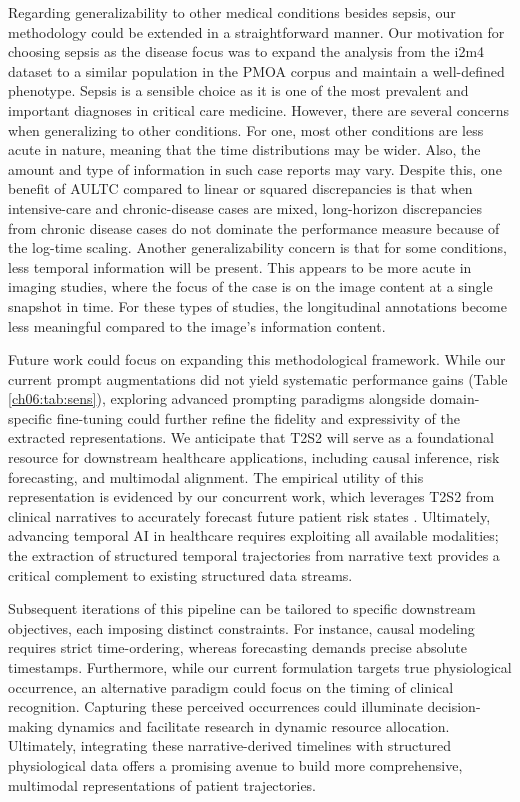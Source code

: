 Regarding generalizability to other medical conditions besides sepsis, our methodology could be extended in a straightforward manner.
Our motivation for choosing sepsis as the disease focus was to expand the analysis from the i2m4 dataset to a similar population in the PMOA corpus and maintain a well-defined phenotype.
Sepsis is a sensible choice as it is one of the most prevalent and important diagnoses in critical care medicine.  
However, there are several concerns when generalizing to other conditions.
For one, most other conditions are less acute in nature, meaning that the time distributions may be wider.
Also, the amount and type of information in such case reports may vary. 
Despite this, one benefit of AULTC compared to linear or squared discrepancies is that when intensive-care and chronic-disease cases are mixed, long-horizon discrepancies from chronic disease cases do not dominate the performance measure because of the log-time scaling.
Another generalizability concern is that for some conditions, less temporal information will be present.
This appears to be more acute in imaging studies, where the focus of the case is on the image content at a single snapshot in time.
For these types of studies, the longitudinal annotations become less meaningful compared to the image's information content.

Future work could focus on expanding this methodological framework.
While our current prompt augmentations did not yield systematic performance gains (Table \ref{ch06:tab:sens}), exploring advanced prompting paradigms alongside domain-specific fine-tuning could further refine the fidelity and expressivity of the extracted representations.
We anticipate that T2S2 will serve as a foundational resource for downstream healthcare applications, including causal inference, risk forecasting, and multimodal alignment.
The empirical utility of this representation is evidenced by our concurrent work, which leverages T2S2 from clinical narratives to accurately forecast future patient risk states \citep{noroozizadeh2026forecasting}.
Ultimately, advancing temporal AI in healthcare requires exploiting all available modalities; the extraction of structured temporal trajectories from narrative text provides a critical complement to existing structured data streams.

Subsequent iterations of this pipeline can be tailored to specific downstream objectives, each imposing distinct constraints.
For instance, causal modeling requires strict time-ordering, whereas forecasting demands precise absolute timestamps.
Furthermore, while our current formulation targets true physiological occurrence, an alternative paradigm could focus on the timing of clinical recognition.
Capturing these perceived occurrences could illuminate decision-making dynamics and facilitate research in dynamic resource allocation. 
Ultimately, integrating these narrative-derived timelines with structured physiological data offers a promising avenue to build more comprehensive, multimodal representations of patient trajectories.


